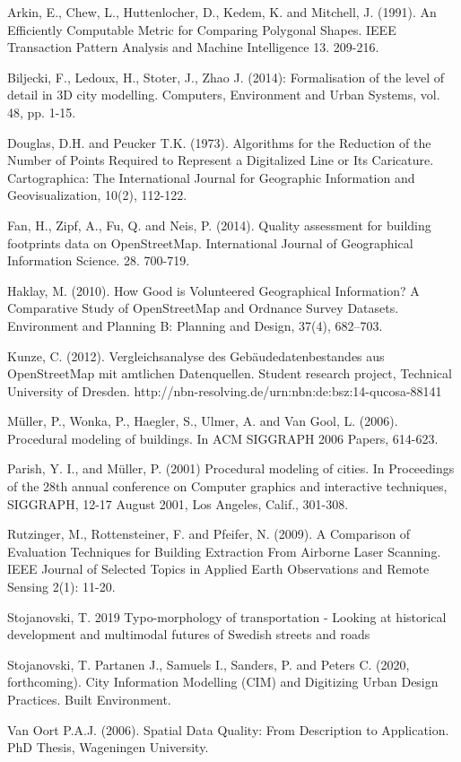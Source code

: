 \documentclass{kththesis}
\begin{document}
\begin{thebibliography}{9}

Arkin, E., Chew, L., Huttenlocher, D., Kedem, K. and Mitchell, J. (1991). An Efficiently Computable Metric for Comparing Polygonal Shapes. IEEE Transaction Pattern Analysis and Machine Intelligence 13. 209-216.

Biljecki, F., Ledoux, H., Stoter, J., Zhao J. (2014): Formalisation of the level of detail in 3D city modelling. Computers, Environment and Urban Systems, vol. 48, pp. 1-15.

Douglas, D.H. and Peucker T.K. (1973). Algorithms for the Reduction of the Number of Points Required to Represent a Digitalized Line or Its Caricature. Cartographica: The International Journal for Geographic Information and Geovisualization, 10(2), 112-122.

Fan, H., Zipf, A., Fu, Q. and Neis, P. (2014). Quality assessment for building footprints data on OpenStreetMap. International Journal of Geographical Information Science. 28. 700-719.

Haklay, M. (2010). How Good is Volunteered Geographical Information? A Comparative Study of OpenStreetMap and Ordnance Survey Datasets. Environment and Planning B: Planning and Design, 37(4), 682–703.

Kunze, C. (2012). Vergleichsanalyse des Gebäudedatenbestandes aus OpenStreetMap mit amtlichen Datenquellen. Student research project, Technical University of Dresden. http://nbn-resolving.de/urn:nbn:de:bsz:14-qucosa-88141

Müller, P., Wonka, P., Haegler, S., Ulmer, A. and Van Gool, L. (2006). Procedural modeling of buildings. In ACM SIGGRAPH 2006 Papers, 614-623.

Parish, Y. I., and Müller, P. (2001) Procedural modeling of cities. In Proceedings of the 28th annual conference on Computer graphics and interactive techniques, SIGGRAPH, 12-17 August 2001, Los Angeles, Calif., 301-308.

Rutzinger, M., Rottensteiner, F. and Pfeifer, N. (2009). A Comparison of Evaluation Techniques for Building Extraction From Airborne Laser Scanning. IEEE Journal of Selected Topics in Applied Earth Observations and Remote Sensing 2(1): 11-20.

Stojanovski, T.
2019
Typo-morphology of transportation - Looking at historical development and multimodal futures of Swedish streets and roads

Stojanovski, T. Partanen J., Samuels I., Sanders, P. and Peters C. (2020, forthcoming). City Information Modelling (CIM) and Digitizing Urban Design Practices. Built Environment.

Van Oort P.A.J. (2006). Spatial Data Quality: From Description to Application. PhD Thesis, Wageningen University.

\end{thebibliography}

\appendix

\tailmatter
\end{document}
